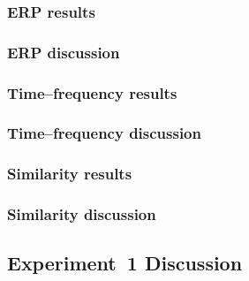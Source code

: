 \subsubsection{ERP results}



\subsubsection{ERP discussion}



\subsubsection{Time--frequency results}



\subsubsection{Time--frequency discussion}



\subsubsection{Similarity results}



\subsubsection{Similarity discussion}



\subsection{Experiment~1 Discussion}


